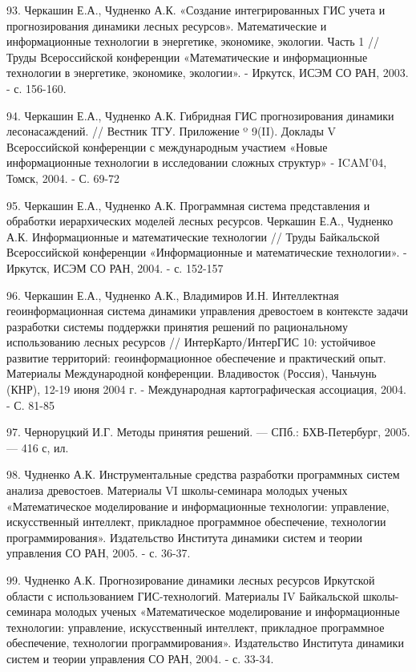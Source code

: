 \documentclass{article}
\begin{document}
93. Черкашин Е.А., Чудненко А.К. «Создание интегрированных 
ГИС учета и прогнозирования динамики лесных 
ресурсов». Математические и информационные 
технологии в энергетике, экономике, экологии. 
Часть 1 // Труды Всероссийской конференции «Математические 
и информационные технологии в энергетике, экономике, 
экологии». - Иркутск, ИСЭМ СО РАН, 2003. - с. 156-160.

94. Черкашин Е.А., Чудненко А.К. Гибридная ГИС 
прогнозирования динамики лесонасаждений. // 
Вестник ТГУ. Приложение º 9(II). Доклады V Всероссийской 
конференции с международным участием «Новые 
информационные технологии в исследовании сложных 
структур» - ICAM'04, Томск, 2004. - С. 69-72

95. Черкашин Е.А., Чудненко А.К. Программная система 
представления и обработки иерархических моделей 
лесных ресурсов. Черкашин Е.А., Чудненко А.К. 
Информационные и математические технологии 
// Труды Байкальской Всероссийской конференции 
«Информационные и математические технологии». 
- Иркутск, ИСЭМ СО РАН, 2004. - с. 152-157

96. Черкашин Е.А., Чудненко А.К., Владимиров И.Н. 
Интеллектная геоинформационная система динамики 
управления древостоем в контексте задачи разработки 
системы поддержки принятия решений по рациональному 
использованию лесных ресурсов // ИнтерКарто/ИнтерГИС 
10: устойчивое развитие территорий: геоинформационное 
обеспечение и практический опыт. Материалы 
Международной конференции. Владивосток (Россия), 
Чаньчунь (КНР), 12-19 июня 2004 г. - Международная 
картографическая ассоциация, 2004. - С. 81-85

97. Черноруцкий И.Г. Методы принятия решений. 
--- СПб.: БХВ-Петербург, 2005. --- 416 с, ил.

98. Чудненко А.К. Инструментальные средства разработки 
программных систем анализа древостоев. Материалы 
VI школы-семинара молодых ученых «Математическое 
моделирование и информационные технологии: 
управление, искусственный интеллект, прикладное 
программное обеспечение, технологии программирования». 
Издательство Института динамики систем и теории 
управления СО РАН, 2005. - с. 36-37.

99. Чудненко А.К. Прогнозирование динамики лесных 
ресурсов Иркутской области с использованием 
ГИС-технологий. Материалы IV Байкальской школы-семинара 
молодых ученых «Математическое моделирование 
и информационные технологии: управление, искусственный 
интеллект, прикладное программное обеспечение, 
технологии программирования». Издательство 
Института динамики систем и теории управления 
СО РАН, 2004. - с. 33-34.
\end{document}
